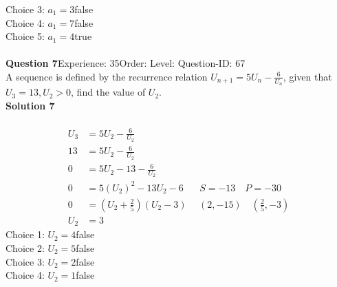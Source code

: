 \documentclass{article}
\begin{document}
Choice 3: \hspace{20pt}$a_1=3$\hspace{20pt}false\\
Choice 4: \hspace{20pt}$a_1=7$\hspace{20pt}false\\
Choice 5: \hspace{20pt}$a_1=4$\hspace{20pt}true\\
\\[4pt]
\noindent\textbf{Question 7}\hspace{20pt}Experience: 35\hspace{20pt}Order: \hspace{20pt}Level: \hspace{20pt}Question-ID: 67\\[2pt]
A sequence is defined by the recurrence relation $U_{n+1}=5U_n-\displaystyle\frac{6}{U_n}$, given that  $U_3 =13, U_2 > 0$, find the value of $U_2$.\\[4pt]
\noindent\textbf{Solution 7}\\[2pt]
\\[-35pt]\begin{align*}
U_3&=5U_2-\displaystyle\frac{6}{U_2}\\[2pt]
13&=5U_2-\displaystyle\frac{6}{U_2}\\[2pt]
0&=5U_2-13 -\displaystyle\frac{6}{U_2}\\[2pt]
0&=5(U_2)^2-13U_2 -6\hspace{20pt}S=-13\quad P=-30\\[2pt]
0&=\left(U_2+\displaystyle\frac{2}{5}\right)(U_2-3)\hspace{15pt}(2,-15)\quad \left(\displaystyle\frac{2}{5},-3\right)\\[2pt]
U_2&=3
\end{align*}
Choice 1: \hspace{20pt}$U_2=4$\hspace{20pt}false\\
Choice 2: \hspace{20pt}$U_2=5$\hspace{20pt}false\\
Choice 3: \hspace{20pt}$U_2=2$\hspace{20pt}false\\
Choice 4: \hspace{20pt}$U_2=1$\hspace{20pt}false\\
\end{document}
